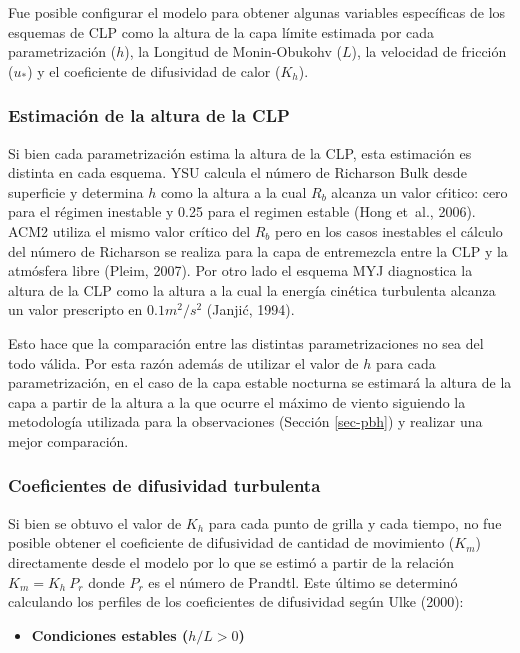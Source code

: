 \documentclass[12pt,spanish,oneside]{book}
\providecommand{\tightlist}{%
  \setlength{\itemsep}{0pt}\setlength{\parskip}{0pt}}
\begin{document}
Fue posible configurar el modelo para obtener algunas variables
específicas de los esquemas de CLP como la altura de la capa límite
estimada por cada parametrización (\(h\)), la Longitud de Monin-Obukohv
(\(L\)), la velocidad de fricción (\(u_*\)) y el coeficiente de
difusividad de calor (\(K_h\)).

\subsubsection{Estimación de la altura de la
CLP}\label{estimacion-de-la-altura-de-la-clp}

Si bien cada parametrización estima la altura de la CLP, esta estimación
es distinta en cada esquema. YSU calcula el número de Richarson Bulk
desde superficie y determina \(h\) como la altura a la cual \(R_b\)
alcanza un valor cŕitico: cero para el régimen inestable y 0.25 para el
regimen estable (Hong et~al., 2006). ACM2 utiliza el mismo valor crítico
del \(R_b\) pero en los casos inestables el cálculo del número de
Richarson se realiza para la capa de entremezcla entre la CLP y la
atmósfera libre (Pleim, 2007). Por otro lado el esquema MYJ diagnostica
la altura de la CLP como la altura a la cual la energía cinética
turbulenta alcanza un valor prescripto en \(0.1 m^2/s^2\) (Janjić,
1994).

Esto hace que la comparación entre las distintas parametrizaciones no
sea del todo válida. Por esta razón además de utilizar el valor de \(h\)
para cada parametrización, en el caso de la capa estable nocturna se
estimará la altura de la capa a partir de la altura a la que ocurre el
máximo de viento siguiendo la metodología utilizada para la
observaciones (Sección \ref{sec-pbh}) y realizar una mejor comparación.

\subsubsection{Coeficientes de difusividad
turbulenta}\label{coeficientes-de-difusividad-turbulenta}

Si bien se obtuvo el valor de \(K_h\) para cada punto de grilla y cada
tiempo, no fue posible obtener el coeficiente de difusividad de cantidad
de movimiento (\(K_m\)) directamente desde el modelo por lo que se
estimó a partir de la relación \(K_m = K_h \: P_r\) donde \(P_r\) es el
número de Prandtl. Este último se determinó calculando los perfiles de
los coeficientes de difusividad según Ulke (2000):

\begin{itemize}
\tightlist
\item
  \textbf{Condiciones estables (\(h/L > 0\))}
\end{itemize}
\end{document}
